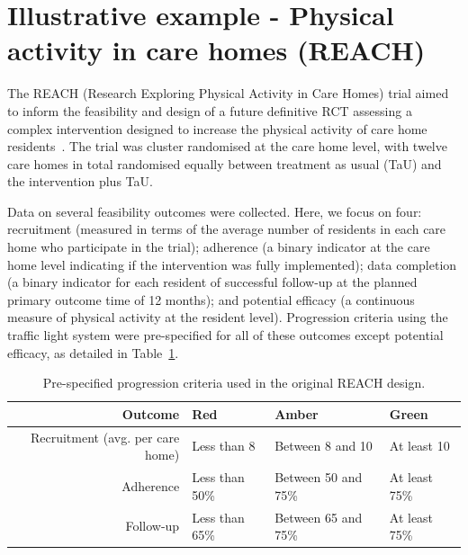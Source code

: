 \documentclass[AMA,STIX1COL]{WileyNJD-v2}
\begin{document}
\section{Illustrative example - Physical activity in care homes (REACH)}\label{sec:REACH}

The REACH (Research Exploring Physical Activity in Care Homes) trial aimed to inform the feasibility and design of a future definitive RCT assessing a complex intervention designed to increase the physical activity of care home residents~\cite{Forster2017}. The trial was cluster randomised at the care home level, with twelve care homes in total randomised equally between treatment as usual (TaU) and the intervention plus TaU.

Data on several feasibility outcomes were collected. Here, we focus on four: recruitment (measured in terms of the average number of residents in each care home who participate in the trial); adherence (a binary indicator at the care home level indicating if the intervention was fully implemented); data completion (a binary indicator for each resident of successful follow-up at the planned primary outcome time of 12 months); and potential efficacy (a continuous measure of physical activity at the resident level). Progression criteria using the traffic light system were pre-specified for all of these outcomes except potential efficacy, as detailed in Table~\ref{tab:pcs}.

\begin{table}
\caption{Pre-specified progression criteria used in the original REACH design.}
\centering
\begin{tabular}{r l l l}
\toprule
Outcome & Red & Amber & Green \\
\midrule
Recruitment (avg. per care home) & Less than 8 & Between 8 and 10 & At least 10 \\
Adherence & Less than 50\% & Between 50 and 75\% & At least 75\% \\
Follow-up & Less than 65\% & Between 65 and 75\% & At least 75\% \\
\bottomrule
\end{tabular}
\label{tab:pcs}
\end{table}

\end{document}
